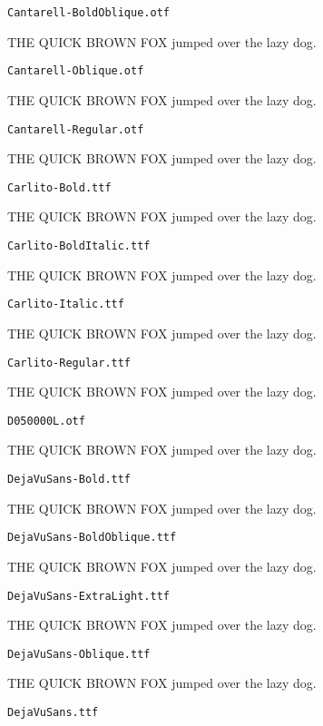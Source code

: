 \documentclass{article}
\begin{document}
\setmainfont[Extension=.otf]{Cantarell-BoldOblique}
\noindent \verb!Cantarell-BoldOblique.otf!

THE QUICK BROWN FOX jumped over the lazy dog.

\setmainfont[Extension=.otf]{Cantarell-Oblique}
\noindent \verb!Cantarell-Oblique.otf!

THE QUICK BROWN FOX jumped over the lazy dog.

\setmainfont[Extension=.otf]{Cantarell-Regular}
\noindent \verb!Cantarell-Regular.otf!

THE QUICK BROWN FOX jumped over the lazy dog.

\setmainfont[Extension=.ttf]{Carlito-Bold}
\noindent \verb!Carlito-Bold.ttf!

THE QUICK BROWN FOX jumped over the lazy dog.

\setmainfont[Extension=.ttf]{Carlito-BoldItalic}
\noindent \verb!Carlito-BoldItalic.ttf!

THE QUICK BROWN FOX jumped over the lazy dog.

\setmainfont[Extension=.ttf]{Carlito-Italic}
\noindent \verb!Carlito-Italic.ttf!

THE QUICK BROWN FOX jumped over the lazy dog.

\setmainfont[Extension=.ttf]{Carlito-Regular}
\noindent \verb!Carlito-Regular.ttf!

THE QUICK BROWN FOX jumped over the lazy dog.

\setmainfont[Extension=.otf]{D050000L}
\noindent \verb!D050000L.otf!

THE QUICK BROWN FOX jumped over the lazy dog.

\setmainfont[Extension=.ttf]{DejaVuSans-Bold}
\noindent \verb!DejaVuSans-Bold.ttf!

THE QUICK BROWN FOX jumped over the lazy dog.

\setmainfont[Extension=.ttf]{DejaVuSans-BoldOblique}
\noindent \verb!DejaVuSans-BoldOblique.ttf!

THE QUICK BROWN FOX jumped over the lazy dog.

\setmainfont[Extension=.ttf]{DejaVuSans-ExtraLight}
\noindent \verb!DejaVuSans-ExtraLight.ttf!

THE QUICK BROWN FOX jumped over the lazy dog.

\setmainfont[Extension=.ttf]{DejaVuSans-Oblique}
\noindent \verb!DejaVuSans-Oblique.ttf!

THE QUICK BROWN FOX jumped over the lazy dog.

\setmainfont[Extension=.ttf]{DejaVuSans}
\noindent \verb!DejaVuSans.ttf!
\end{document}
